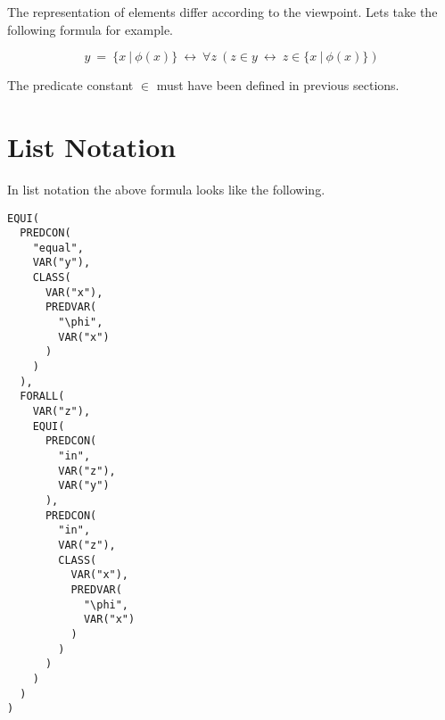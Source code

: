 \documentclass[a4paper,german,10pt,twoside]{book}
\theoremstyle{definition}
\theoremstyle{remark}
\begin{document}
The representation of elements differ according to the viewpoint. Lets take the following formula for example.

$$y \ =  \ \{ x \ | \ \phi(x) \} \ \leftrightarrow \ \forall z\ (z \in y\ \leftrightarrow \ z \in \{ x \ | \ \phi(x) \} )$$

The predicate constant $\in$ must have been defined in previous sections.

\section{List Notation} \label{chapter4_section1} \hypertarget{chapter4_section1}{}
In list notation the above formula looks like the following.

\begin{verbatim}
EQUI(
  PREDCON(
    "equal",
    VAR("y"),
    CLASS(
      VAR("x"),
      PREDVAR(
        "\phi",
        VAR("x")
      )
    )
  ),
  FORALL(
    VAR("z"),
    EQUI(
      PREDCON(
        "in",
        VAR("z"),
        VAR("y")
      ),
      PREDCON(
        "in",
        VAR("z"),
        CLASS(
          VAR("x"),
          PREDVAR(
            "\phi",
            VAR("x")
          )
        )
      )
    )
  )
)
\end{verbatim}
\end{document}
